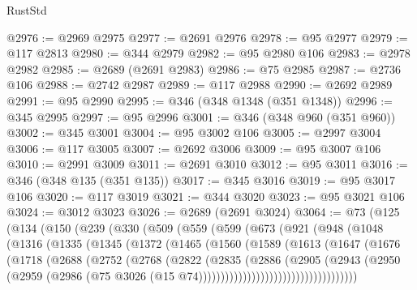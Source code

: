 \begin{lexlean}{RustStd}
\begin{coremodule}
@2976 := @2969 @2975
@2977 := @2691 @2976
@2978 := @95 @2977
@2979 := @117 @2813
@2980 := @344 @2979
@2982 := @95 @2980 @106
@2983 := @2978 @2982
@2985 := @2689 (@2691 @2983)
@2986 := @75 @2985
@2987 := @2736 @106
@2988 := @2742 @2987
@2989 := @117 @2988
@2990 := @2692 @2989
@2991 := @95 @2990
@2995 := @346 (@348 @1348 (@351 @1348))
@2996 := @345 @2995
@2997 := @95 @2996
@3001 := @346 (@348 @960 (@351 @960))
@3002 := @345 @3001
@3004 := @95 @3002 @106
@3005 := @2997 @3004
@3006 := @117 @3005
@3007 := @2692 @3006
@3009 := @95 @3007 @106
@3010 := @2991 @3009
@3011 := @2691 @3010
@3012 := @95 @3011
@3016 := @346 (@348 @135 (@351 @135))
@3017 := @345 @3016
@3019 := @95 @3017 @106
@3020 := @117 @3019
@3021 := @344 @3020
@3023 := @95 @3021 @106
@3024 := @3012 @3023
@3026 := @2689 (@2691 @3024)
@3064 := @73
    (@125
      (@134
        (@150
          (@239
            (@330
              (@509
                (@559
                  (@599
                    (@673
                      (@921
                        (@948
                          (@1048
                            (@1316
                              (@1335
                                (@1345
                                  (@1372
                                    (@1465
                                      (@1560
                                        (@1589
                                          (@1613
                                            (@1647
                                              (@1676
                                                (@1718
                                                  (@2688
                                                    (@2752
                                                      (@2768
                                                        (@2822
                                                          (@2835
                                                            (@2886
                                                              (@2905
                                                                (@2943
                                                                  (@2950
                                                                    (@2959
                                                                      (@2986
                                                                        (@75
                                                                          @3026
                                                                          (@15
                                                                            @74))))))))))))))))))))))))))))))))))))

\end{coremodule}
\end{lexlean}
